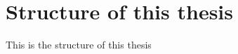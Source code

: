 \section{Structure of this thesis}
\label{sec:thesis_structure}
This is the structure of this thesis